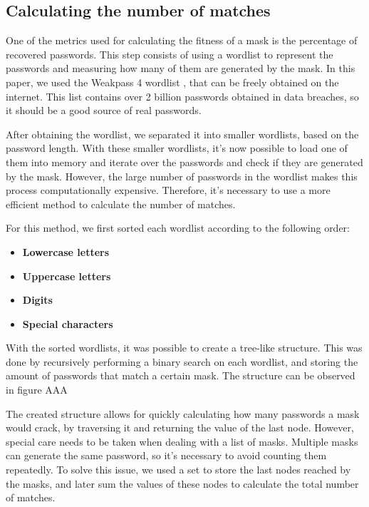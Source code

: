 \documentclass[sigconf,authordraft]{acmart}
\begin{document}
\subsection{Calculating the number of matches}

One of the metrics used for calculating the fitness of a mask is the percentage of recovered passwords.
This step consists of using a wordlist to represent the passwords and measuring how many of them are generated by the mask.
In this paper, we used the Weakpass 4 wordlist \cite{weakpass4}, that can be freely obtained on the internet.
This list contains over 2 billion passwords obtained in data breaches, so it should be a good source of real passwords.

After obtaining the wordlist, we separated it into smaller wordlists, based on the password length.
With these smaller wordlists, it's now possible to load one of them into memory and iterate over the passwords and check if they are generated by the mask.
However, the large number of passwords in the wordlist makes this process computationally expensive.
Therefore, it's necessary to use a more efficient method to calculate the number of matches.

For this method, we first sorted each wordlist according to the following order:

\begin{itemize}
  \item \textbf{Lowercase letters}
  \item \textbf{Uppercase letters}
  \item \textbf{Digits}
  \item \textbf{Special characters}
\end{itemize}

With the sorted wordlists, it was possible to create a tree-like structure.
This was done by recursively performing a binary search on each wordlist, and storing the amount of passwords that match a certain mask.
The structure can be observed in figure AAA

The created structure allows for quickly calculating how many passwords a mask would crack, by traversing it and returning the value of the last node.
However, special care needs to be taken when dealing with a list of masks.
Multiple masks can generate the same password, so it's necessary to avoid counting them repeatedly.
To solve this issue, we used a set to store the last nodes reached by the masks, and later sum the values of these nodes to calculate the total number of matches.
\end{document}
